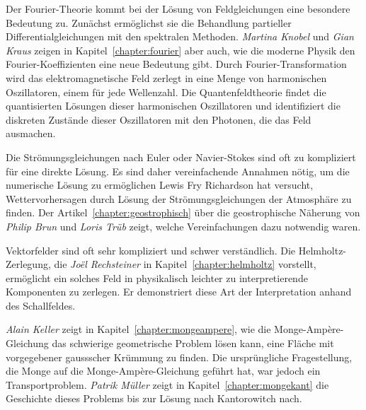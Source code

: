 Der Fourier-Theorie kommt bei der Lösung von Feldgleichungen eine
besondere Bedeutung zu.
%
Zunächst ermöglichst sie die Behandlung partieller Differentialgleichungen
mit den spektralen Methoden.
%
\emph{Martina Knobel}
%
%
und \emph{Gian Kraus}
%
%
zeigen in Kapitel~\ref{chapter:fourier} aber auch, wie die moderne
Physik den Fourier-Koeffizienten eine neue Bedeutung gibt.
Durch Fourier-Transformation wird das elektromagnetische Feld
zerlegt in eine Menge von harmonischen Oszillatoren, einem für jede
Wellenzahl.
%
%
Die Quantenfeldtheorie findet die quantisierten Lösungen dieser
%
harmonischen Oszillatoren und identifiziert die diskreten Zustände
dieser Oszillatoren mit den Photonen, die das Feld ausmachen.
%

Die Strömungsgleichungen nach Euler oder Navier-Stokes
sind oft zu kompliziert für eine direkte Lösung.
Es sind daher vereinfachende Annahmen nötig, um die numerische
Lösung zu ermöglichen
Lewis Fry Richardson hat versucht, Wettervorhersagen durch Lösung
%
%
der Strömungsgleichungen der Atmosphäre zu finden.
Der Artikel~\ref{chapter:geostrophisch} über die geostrophische
Näherung von 
%
\emph{Philip Brun}
%
%
und
\emph{Loris Trüb}
%
%
zeigt, welche Vereinfachungen dazu notwendig waren.

Vektorfelder sind oft sehr kompliziert und schwer verständlich.
Die Helmholtz-Zer\-le\-gung, die
%
\emph{Joël Rechsteiner} 
%
%
in Kapitel~\ref{chapter:helmholtz} vorstellt, ermöglicht ein solches
Feld in physikalisch leichter zu interpretierende Komponenten zu
zerlegen. 
Er demonstriert diese Art der Interpretation anhand des Schallfeldes.

\emph{Alain Keller}
%
%
zeigt in Kapitel~\ref{chapter:mongeampere}, wie die Monge-Ampère-Gleichung
%
das schwierige geometrische Problem lösen kann, eine Fläche mit vorgegebener
gaussscher Krümmung zu finden.
Die ursprüngliche Fragestellung, die Monge auf die Monge-Ampère-Gleichung
geführt hat, war jedoch ein Transportproblem.
%
\emph{Patrik Müller}
%
%
zeigt in Kapitel~\ref{chapter:mongekant} die Geschichte dieses Problems
bis zur Lösung nach Kantorowitch nach.
%

